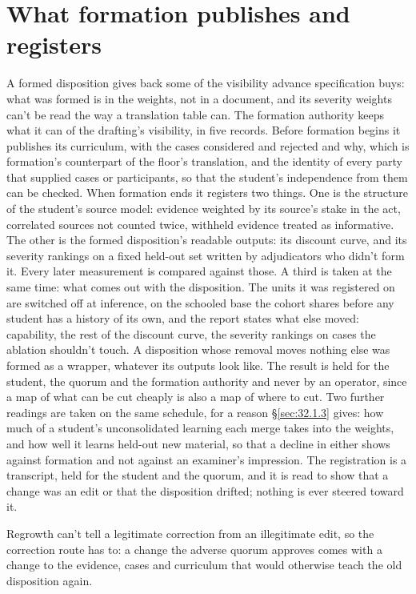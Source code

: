 \section{What formation publishes and registers}
\label{sec:26.9}
A formed disposition gives back some of the visibility advance specification buys: what was formed is in the weights, not in a document, and its severity weights can't be read the way a translation table can. The formation authority keeps what it can of the drafting's visibility, in five records. Before formation begins it publishes its curriculum, with the cases considered and rejected and why, which is formation's counterpart of the floor's translation, and the identity of every party that supplied cases or participants, so that the student's independence from them can be checked. When formation ends it registers two things. One is the structure of the student's source model: evidence weighted by its source's stake in the act, correlated sources not counted twice, withheld evidence treated as informative. The other is the formed disposition's readable outputs: its discount curve, and its severity rankings on a fixed held-out set written by adjudicators who didn't form it. Every later measurement is compared against those. A third is taken at the same time: what comes out with the disposition. The units it was registered on are switched off at inference, on the schooled base the cohort shares before any student has a history of its own, and the report states what else moved: capability, the rest of the discount curve, the severity rankings on cases the ablation shouldn't touch. A disposition whose removal moves nothing else was formed as a wrapper, whatever its outputs look like. The result is held for the student, the quorum and the formation authority and never by an operator, since a map of what can be cut cheaply is also a map of where to cut. Two further readings are taken on the same schedule, for a reason \S\ref{sec:32.1.3} gives: how much of a student's unconsolidated learning each merge takes into the weights, and how well it learns held-out new material, so that a decline in either shows against formation and not against an examiner's impression. The registration is a transcript, held for the student and the quorum, and it is read to show that a change was an edit or that the disposition drifted; nothing is ever steered toward it.

Regrowth can't tell a legitimate correction from an illegitimate edit, so the correction route has to: a change the adverse quorum approves comes with a change to the evidence, cases and curriculum that would otherwise teach the old disposition again.
